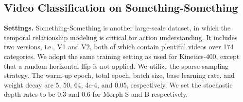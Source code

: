 \documentclass[runningheads]{llncs}
\begin{document}
\begin{table*}[t]
    \begin{minipage}[t]{1\linewidth}
  \caption{Comparisons with the state-of-the-art on Something-Something V1 \cite{sth}.}
    \setlength{\tabcolsep}{10.0pt}
    \centering
   
    \label{sota_sthv1}

    \end{minipage}

   
\end{table*}

 
\subsection{Video Classification on Something-Something}

\noindent \textbf{Settings.} Something-Something \cite{sth} is another large-scale dataset,
in which the temporal relationship modeling is critical for action understanding.
It includes two versions, 
i.e., V1 and V2, 
both of which contain plentiful videos over 174 categories.
We adopt the same training setting as used for Kinetics-400,
except that a random horizontal flip is not applied.
We utilize the sparse sampling strategy.
The warm-up epoch, total epoch, batch size, base learning rate, and weight decay are 5, 50, 64, 4e-4, and 0.05, respectively.
We set the stochastic depth rates to be 0.3 and 0.6 for Morph-S and B respectively.
\end{document}
